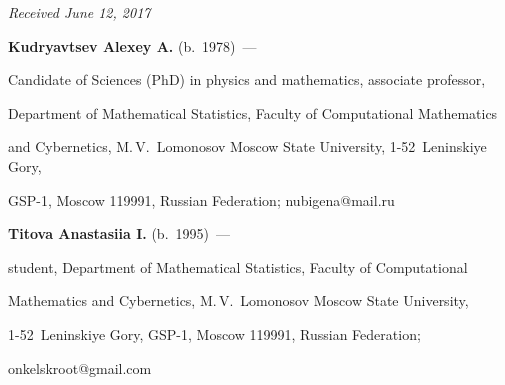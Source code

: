 \hfill{\small\textit{Received June 12, 2017}}










\Contr





\noindent


\textbf{Kudryavtsev Alexey A.} (b.\ 1978)~--- 


Candidate of Sciences (PhD) in physics and mathematics, associate professor, 


Department of Mathematical Statistics, Faculty of Computational Mathematics 


and Cybernetics, M.\,V.~Lomonosov Moscow State University, 1-52~Leninskiye Gory, 


GSP-1, Moscow 119991, Russian Federation; \mbox{nubigena@mail.ru}





\vspace*{3pt}





\noindent


\textbf{Titova Anastasiia I.} (b.\ 1995)~--- 


student, Department of Mathematical Statistics, Faculty of Computational 


Mathematics and Cybernetics, M.\,V.~Lomonosov Moscow State University, 


1-52~Leninskiye Gory, GSP-1, Moscow 119991, Russian Federation; 


\mbox{onkelskroot@gmail.com}


\label{end\stat}








\renewcommand{\bibname}{\protect\rm Литература} 


